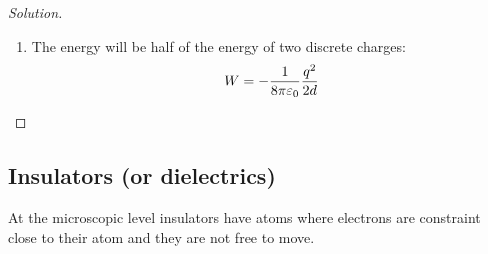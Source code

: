 \documentclass[12pt]{extarticle}
\begin{document}
\begin{proof}[Solution]
\begin{enumerate}[label = \alph*)]
        \item The energy will be half of the energy of two discrete charges:
              \begin{equation}
                  W = - \frac{1}{8 \pi \varepsilon_0} \frac{q^2}{2d}
              \end{equation}
    \end{enumerate}
\end{proof}

\subsection{Insulators (or dielectrics)}

At the microscopic level insulators have atoms where electrons are constraint close to their atom and they are not free to move.
\end{document}
